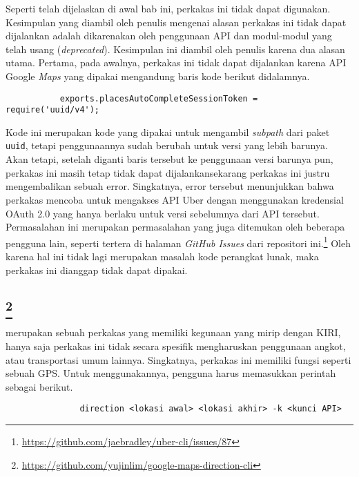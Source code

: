 Seperti telah dijelaskan di awal bab ini, perkakas ini tidak dapat digunakan. Kesimpulan yang diambil oleh penulis mengenai alasan perkakas ini tidak dapat dijalankan adalah dikarenakan oleh penggunaan API dan modul-modul yang telah usang (\textit{deprecated}). Kesimpulan ini diambil oleh penulis karena dua alasan utama. Pertama, pada awalnya, perkakas ini tidak dapat dijalankan karena API Google \textit{Maps} yang dipakai mengandung baris kode berikut didalamnya.
\vspace{-0.5em} %
\begin{verbatim}
           exports.placesAutoCompleteSessionToken = require('uuid/v4');
\end{verbatim}

Kode ini merupakan kode yang dipakai untuk mengambil \textit{subpath} dari paket \verb|uuid|, tetapi penggunaannya sudah berubah untuk versi yang lebih barunya. Akan tetapi, setelah diganti baris tersebut ke penggunaan versi barunya pun, perkakas ini masih tetap tidak dapat dijalankan\textemdash sekarang perkakas ini justru mengembalikan sebuah error. Singkatnya, error tersebut menunjukkan bahwa perkakas mencoba untuk mengakses API Uber dengan menggunakan kredensial OAuth 2.0 yang hanya berlaku untuk versi sebelumnya dari API tersebut. Permasalahan ini merupakan permasalahan yang juga ditemukan oleh beberapa pengguna lain, seperti tertera di halaman \textit{GitHub Issues} dari repositori ini.\footnote{\href{https://github.com/jaebradley/uber-cli/issues/87}{https://github.com/jaebradley/uber-cli/issues/87}} Oleh karena hal ini tidak lagi merupakan masalah kode perangkat lunak, maka perkakas ini dianggap tidak dapat dipakai.

\subsection{\googlemapscli\footnote{\href{https://github.com/yujinlim/google-maps-direction-cli}{https://github.com/yujinlim/google-maps-direction-cli}}}
\label{sec:similarapps-googlemapscli}

\googlemapscli merupakan sebuah perkakas \cl yang memiliki kegunaan yang mirip dengan KIRI, hanya saja perkakas ini tidak secara spesifik mengharuskan penggunaan angkot, atau transportasi umum lainnya. Singkatnya, perkakas ini memiliki fungsi seperti sebuah GPS. Untuk menggunakannya, pengguna harus memasukkan perintah sebagai berikut.
\vspace{-0.5em} %
\begin{verbatim}
               direction <lokasi awal> <lokasi akhir> -k <kunci API>
\end{verbatim}


